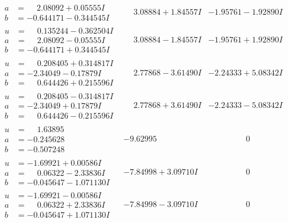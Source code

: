 \documentclass[1p]{elsarticle_modified}
\theoremstyle{definition}
\begin{document}
$$\begin{array}{c|c|c}
\begin{aligned}
a &= \phantom{-}2.08092 + 0.05555 I \\
b &= -0.644171 - 0.344545 I\end{aligned}
 & \phantom{-}3.08884 + 1.84557 I & -1.95761 - 1.92890 I \\ \hline\begin{aligned}
u &= \phantom{-}0.135244 - 0.362504 I \\
a &= \phantom{-}2.08092 - 0.05555 I \\
b &= -0.644171 + 0.344545 I\end{aligned}
 & \phantom{-}3.08884 - 1.84557 I & -1.95761 + 1.92890 I \\ \hline\begin{aligned}
u &= \phantom{-}0.208405 + 0.314817 I \\
a &= -2.34049 - 0.17879 I \\
b &= \phantom{-}0.644426 + 0.215596 I\end{aligned}
 & \phantom{-}2.77868 - 3.61490 I & -2.24333 + 5.08342 I \\ \hline\begin{aligned}
u &= \phantom{-}0.208405 - 0.314817 I \\
a &= -2.34049 + 0.17879 I \\
b &= \phantom{-}0.644426 - 0.215596 I\end{aligned}
 & \phantom{-}2.77868 + 3.61490 I & -2.24333 - 5.08342 I \\ \hline\begin{aligned}
u &= \phantom{-}1.63895\phantom{ +0.000000I} \\
a &= -0.245628\phantom{ +0.000000I} \\
b &= -0.507248\phantom{ +0.000000I}\end{aligned}
 & -9.62995\phantom{ +0.000000I} & \phantom{-0.000000 } 0 \\ \hline\begin{aligned}
u &= -1.69921 + 0.00586 I \\
a &= \phantom{-}0.06322 - 2.33836 I \\
b &= -0.045647 - 1.071130 I\end{aligned}
 & -7.84998 + 3.09710 I & \phantom{-0.000000 } 0 \\ \hline\begin{aligned}
u &= -1.69921 - 0.00586 I \\
a &= \phantom{-}0.06322 + 2.33836 I \\
b &= -0.045647 + 1.071130 I\end{aligned}
 & -7.84998 - 3.09710 I & \phantom{-0.000000 } 0 \\ \hline\begin{aligned}

\end{aligned}
\end{array}$$
\end{document}
